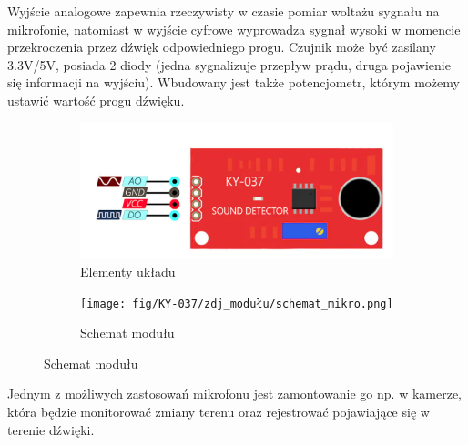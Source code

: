\documentclass[11pt, a4paper]{article}
\begin{document}
\vspace{0.75cm}
Wyjście analogowe zapewnia rzeczywisty w czasie pomiar woltażu sygnału na mikrofonie, natomiast w wyjście cyfrowe wyprowadza sygnał wysoki w momencie przekroczenia przez dźwięk odpowiedniego progu. Czujnik może być zasilany 3.3V/5V, posiada 2 diody (jedna sygnalizuje przepływ prądu, druga pojawienie się informacji na wyjściu). Wbudowany jest także potencjometr, którym możemy ustawić wartość progu dźwięku. 

\begin{figure}[h]
\centering
\begin{subfigure}{.5\textwidth}
\centering
\includegraphics[width=.8\linewidth]{fig/KY-037/zasada_dzialania/uklad.png}
\caption{Elementy układu \cite{modul}}
\label{fig:_zdjecie_modulu}
\end{subfigure}%
\begin{subfigure}{.5\textwidth}
\centering
\texttt{[image: fig/KY-037/zdj\_modułu/schemat\_mikro.png]}
\caption{Schemat modułu \cite{schemat}}
\label{fig:_schemat_modulu}
\end{subfigure}
\label{fig:modul}
\end{figure}
\vspace{0.5cm}

Jednym z możliwych zastosowań mikrofonu jest zamontowanie go np. w kamerze, która będzie monitorować zmiany terenu oraz rejestrować pojawiające się w terenie dźwięki. 
\newpage
\end{document}
